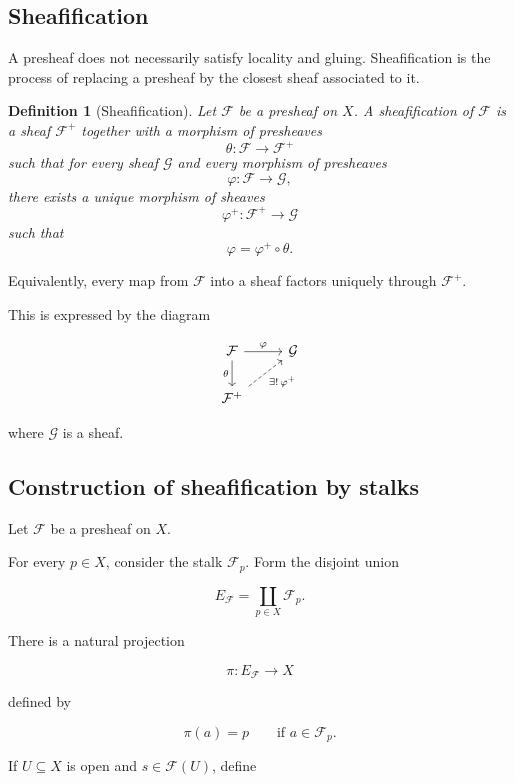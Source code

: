 \documentclass[12pt,a4paper]{article}
\newtheorem{definition}{Definition}[section]
\begin{document}
\subsection{Sheafification}

A presheaf does not necessarily satisfy locality and gluing.
Sheafification is the process of replacing a presheaf by the closest sheaf
associated to it.

\begin{definition}[Sheafification]
	Let $\mathcal F$ be a presheaf on $X$.
	A sheafification of $\mathcal F$ is a sheaf $\mathcal F^+$ together with a
	morphism of presheaves
	\[
	\theta : \mathcal F \longrightarrow \mathcal F^+
	\]
	such that for every sheaf $\mathcal G$ and every morphism of presheaves
	\[
	\varphi : \mathcal F \longrightarrow \mathcal G,
	\]
	there exists a unique morphism of sheaves
	\[
	\varphi^+ : \mathcal F^+ \longrightarrow \mathcal G
	\]
	such that
	\[
	\varphi = \varphi^+ \circ \theta.
	\]
\end{definition}

Equivalently, every map from $\mathcal F$ into a sheaf factors uniquely through
$\mathcal F^+$.

This is expressed by the diagram

\[
\begin{tikzcd}
	\mathcal F \arrow[r, "\varphi"] \arrow[d, "\theta"'] &
	\mathcal G \\
	\mathcal F^+ \arrow[ur, dashed, "\exists !\,\varphi^+"'] &
\end{tikzcd}
\]

where $\mathcal G$ is a sheaf.

\subsection{Construction of sheafification by stalks}

Let $\mathcal F$ be a presheaf on $X$.

For every $p \in X$, consider the stalk $\mathcal F_p$.
Form the disjoint union

\[
E_{\mathcal F}
=
\coprod_{p \in X} \mathcal F_p.
\]

There is a natural projection

\[
\pi : E_{\mathcal F} \longrightarrow X
\]

defined by

\[
\pi(a)=p
\qquad
\text{if } a \in \mathcal F_p.
\]

If $U \subseteq X$ is open and $s \in \mathcal F(U)$, define
\end{document}
